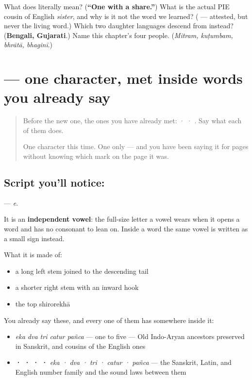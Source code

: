 \begin{tcolorbox}[breakable,colback=teal!4,colframe=teal!35!black,title={Before you move on}]
What does  literally mean? (\textbf{\textquotedblleft{}One with a share.\textquotedblright{}}) What is the actual PIE cousin of English \emph{sister}, and why is it not the word we learned? (\textbf{} — attested, but never the living word.) Which two daughter languages descend from  instead? (\textbf{Bengali, Gujarati}.) Name this chapter's four people. (\emph{Mitram, kuṭumbam, bhrātā, bhaginī}.)
\end{tcolorbox}
\section[\texorpdfstring{\sk{ए} (e)}{ए (e)}]{ — one character, met inside words you already say}

\label{lesson:SA-S211-letter-e}



\begin{quote}
Before the new one, the ones you have already met:  ·  · . Say what each of them does.

One character this time. One only — and you have been saying it for pages without knowing which mark on the page it was.
\end{quote}

\subsection*{Script you'll notice: }
\textbf{} — \emph{e}.

It is an \textbf{independent vowel}: the full-size letter a vowel wears when it opens a word and has no consonant to lean on. Inside a word the same vowel is written as a small sign instead.

What it is made of:

\begin{itemize}
\raggedright
  \item a long left stem joined to the descending tail
  \item a shorter right stem with an inward hook
  \item the top shirorekhā
\end{itemize}

You already say these, and every one of them has  somewhere inside it:

\begin{itemize}
\raggedright
  \item \textbf{    } \emph{eka dva tri catur pañca} — one to five — Old Indo-Aryan ancestors preserved in Sanskrit, and cousins of the English ones
  \item \textbf{ ·  ·  ·  · } \emph{eka · dva · tri · catur · pañca} — the Sanskrit, Latin, and English number family and the sound laws between them
\end{itemize}

